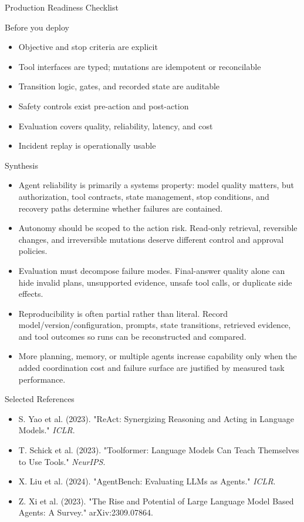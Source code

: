 \documentclass[aspectratio=169]{beamer}
\begin{document}
\begin{frame}{Production Readiness Checklist}
  \begin{theorembox}{Before you deploy}
    \begin{itemize}
      \item Objective and stop criteria are explicit
      \item Tool interfaces are typed; mutations are idempotent or reconcilable
      \item Transition logic, gates, and recorded state are auditable
      \item Safety controls exist pre-action and post-action
      \item Evaluation covers quality, reliability, latency, and cost
      \item Incident replay is operationally usable
    \end{itemize}
  \end{theorembox}
\end{frame}

\begin{frame}{Synthesis}
  \begin{itemize}
    \item Agent reliability is primarily a systems property: model quality matters, but authorization, tool contracts, state management, stop conditions, and recovery paths determine whether failures are contained.
    \item Autonomy should be scoped to the action risk. Read-only retrieval, reversible changes, and irreversible mutations deserve different control and approval policies.
    \item Evaluation must decompose failure modes. Final-answer quality alone can hide invalid plans, unsupported evidence, unsafe tool calls, or duplicate side effects.
    \item Reproducibility is often partial rather than literal. Record model/version/configuration, prompts, state transitions, retrieved evidence, and tool outcomes so runs can be reconstructed and compared.
    \item More planning, memory, or multiple agents increase capability only when the added coordination cost and failure surface are justified by measured task performance.
  \end{itemize}
\end{frame}

\begin{frame}{Selected References}
  \small
  \begin{itemize}
    \item S. Yao et al. (2023). "ReAct: Synergizing Reasoning and Acting in Language Models." \textit{ICLR}.
    \item T. Schick et al. (2023). "Toolformer: Language Models Can Teach Themselves to Use Tools." \textit{NeurIPS}.
    \item X. Liu et al. (2024). "AgentBench: Evaluating LLMs as Agents." \textit{ICLR}.
    \item Z. Xi et al. (2023). "The Rise and Potential of Large Language Model Based Agents: A Survey." arXiv:2309.07864.
  \end{itemize}
\end{frame}
\end{document}
